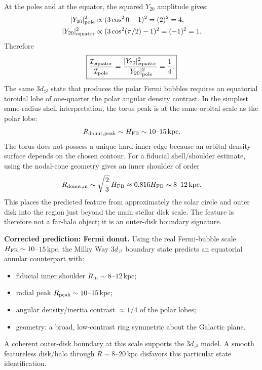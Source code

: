 \documentclass[11pt,a4paper]{article}
\newcommand{\kpc}{\mathrm{kpc}}
\begin{document}
At the poles and at the equator, the squared $Y_{20}$ amplitude gives:
\begin{align}
  |Y_{20}|^2_{\rm pole}&\propto(3\cos^2 0-1)^2=(2)^2=4,
  \label{eq:pole}\\
  |Y_{20}|^2_{\rm equator}&\propto(3\cos^2(\pi/2)-1)^2=(-1)^2=1.
  \label{eq:equator}
\end{align}
Therefore
\begin{equation}
  \boxed{\frac{\mathcal I_{\rm equator}}{\mathcal I_{\rm pole}}
  =\frac{|Y_{20}|^2_{\rm equator}}{|Y_{20}|^2_{\rm pole}}=\frac14.}
  \label{eq:quarter_density}
\end{equation}
The same $3d_{z^2}$ state that produces the polar Fermi bubbles requires an
equatorial toroidal lobe of one-quarter the polar angular density contrast.
In the simplest same-radius shell interpretation, the torus peak is at the
same orbital scale as the polar lobe:
\begin{equation}
  R_{\rm donut,peak}\sim H_{\rm FB}\sim10\text{--}15\,\kpc.
  \label{eq:donut_peak_corrected}
\end{equation}
The torus does not possess a unique hard inner edge because an orbital density
surface depends on the chosen contour. For a fiducial shell/shoulder estimate,
using the nodal-cone geometry gives an inner shoulder of order
\begin{equation}
  R_{\rm donut,in}\sim\sqrt{\frac{2}{3}}\,H_{\rm FB}
  \approx0.816H_{\rm FB}
  \sim8\text{--}12\,\kpc.
  \label{eq:donut_inner_corrected}
\end{equation}
This places the predicted feature from approximately the solar circle and
outer disk into the region just beyond the main stellar disk scale. The
feature is therefore not a far-halo object; it is an outer-disk boundary
signature.

\begin{mdframed}
\textbf{Corrected prediction: Fermi donut.}
Using the real Fermi-bubble scale $H_{\rm FB}\sim10$--$15\,\kpc$, the Milky
Way $3d_{z^2}$ boundary state predicts an equatorial annular counterpart with:
\begin{itemize}
  \item fiducial inner shoulder $R_{\rm in}\sim8$--$12\,\kpc$;
  \item radial peak $R_{\rm peak}\sim10$--$15\,\kpc$;
  \item angular density/inertia contrast $\approx1/4$ of the polar lobes;
  \item geometry: a broad, low-contrast ring symmetric about the Galactic plane.
\end{itemize}
A coherent outer-disk boundary at this scale supports the $3d_{z^2}$ model.
A smooth featureless disk/halo through $R\sim8$--$20\,\kpc$ disfavors this
particular state identification.
\end{mdframed}
\end{document}
